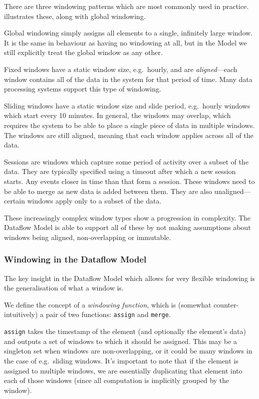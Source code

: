 There are three windowing patterns which are most commonly used in practice.
 illustrates these, along with global windowing.

Global windowing simply assigns all elements to a single, infinitely large window.
It is the same in behaviour as having no windowing at all, but in the Model we still explicitly treat the global window as any other.

Fixed windows have a static window size, e.g.\ hourly, and are \emph{aligned}---each window contains all of the data in the system for that period of time.
Many data processing systems support this type of windowing.

Sliding windows have a static window size and slide period, e.g.\ hourly windows which start every 10 minutes.
In general, the windows may overlap, which requires the system to be able to place a single piece of data in multiple windows.
The windows are still aligned, meaning that each window applies across all of the data.

Sessions are windows which capture some period of activity over a subset of the data.
They are typically specified using a timeout after which a new session starts.
Any events closer in time than that form a session.
These windows need to be able to merge as new data is added between them.
They are also unaligned---certain windows apply only to a subset of the data.

These increasingly complex window types show a progression in complexity.
The Dataflow Model is able to support all of these by not making assumptions about windows being aligned, non-overlapping or immutable.

\subsubsection{Windowing in the Dataflow Model}
The key insight in the Dataflow Model which allows for very flexible windowing is the generalisation of what a window is.

We define the concept of a \emph{windowing function}, which is (somewhat counter-intuitively) a pair of two functions: \texttt{assign} and \texttt{merge}.

\texttt{assign} takes the timestamp of the element (and optionally the element's data) and outputs a set of windows to which it should be assigned.
This may be a singleton set when windows are non-overlapping, or it could be many windows in the case of e.g.\ sliding windows.
It's important to note that if the element is assigned to multiple windows, we are essentially duplicating that element into each of those windows (since all computation is implicitly grouped by the window).

